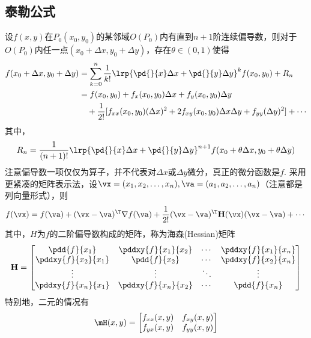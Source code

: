 \subsection{泰勒公式}
\begin{theorem}[Taylor]
设$f(x,y)$在$P_0(x_0,y_0)$的某邻域$O(P_0)$内有直到$n+1$阶连续偏导数，则对于$O(P_0)$内任一点$(x_0+\Delta x,y_0+\Delta y)$，存在$\theta\in(0,1)$使得
\[\begin{aligned}
f(x_0+\Delta x,y_0+\Delta y)&=\sum_{k=0}^n\frac{1}{k!}\lrp{\pd{}{x}\Delta x+\pd{}{y}\Delta y}^kf(x_0,y_0)+R_n\\
&=f(x_0,y_0)+f_x(x_0,y_0)\Delta x+f_y(x_0,y_0)\Delta y\\
&\quad+\frac{1}{2!}[f_{xx}(x_0,y_0)(\Delta x)^2+2f_{xy}(x_0,y_0)\Delta x\Delta y+f_{yy}(\Delta y)^2]+\cdots
\end{aligned}\]
其中，
\[R_n=\frac{1}{(n+1)!}\lrp{\pd{}{x}\Delta x+\pd{}{y}\Delta y}^{n+1}f(x_0+\theta\Delta x,y_0+\theta\Delta y)\]
注意偏导数一项仅仅为算子，并不代表对$\Delta x$或$\Delta y$微分，真正的微分函数是$f$.
采用更紧凑的矩阵表示法，设$\vx=(x_1,x_2,\ldots,x_n),\va=(a_1,a_2,\ldots,a_n)$（注意都是列向量形式），则
\[f(\vx)=f(\va)+(\vx-\va)^\T\nabla f(\va)+\frac{1}{2!}(\vx-\va)^\T \mathbf{H}(\vx)(\vx-\va)+\cdots\]
其中，$H$为$f$的二阶偏导数构成的矩阵，称为海森(Hessian)矩阵
\[\mathbf{H}=\begin{bmatrix}\pdd{f}{x_1} & \pddxy{f}{x_1}{x_2} &\cdots &\pddxy{f}{x_1}{x_n}\\
\pddxy{f}{x_2}{x_1}&\pdd{f}{x_2}&\cdots&\pddxy{f}{x_2}{x_n}\\
\vdots&\vdots&\ddots&\vdots\\
\pddxy{f}{x_n}{x_1}&\pddxy{f}{x_n}{x_2}&\cdots&\pdd{f}{x_n}\end{bmatrix}\]
特别地，二元的情况有
\[\mH(x,y)=\begin{bmatrix}f_{xx}(x,y) & f_{xy}(x,y)\\f_{yx}(x,y) & f_{yy}(x,y)\end{bmatrix}\]
\end{theorem}